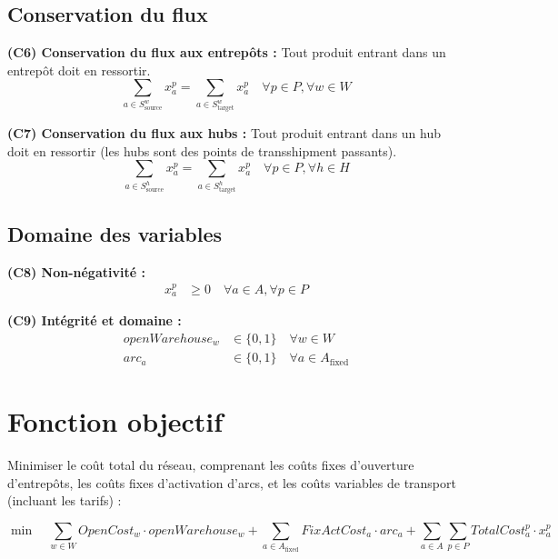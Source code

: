 \documentclass{article}
\begin{document}
\subsection{Conservation du flux}

\noindent\textbf{(C6) Conservation du flux aux entrepôts :}
Tout produit entrant dans un entrepôt doit en ressortir.
\begin{equation}
    \sum_{a \in S_{\text{source}}^w} x_a^p = \sum_{a \in S_{\text{target}}^w} x_a^p \quad \forall p \in P, \forall w \in W \label{eq:wh_flow}
\end{equation}

\noindent\textbf{(C7) Conservation du flux aux hubs :}
Tout produit entrant dans un hub doit en ressortir (les hubs sont des points de transshipment passants).
\begin{equation}
    \sum_{a \in S_{\text{source}}^h} x_a^p = \sum_{a \in S_{\text{target}}^h} x_a^p \quad \forall p \in P, \forall h \in H \label{eq:hub_flow}
\end{equation}

\subsection{Domaine des variables}

\noindent\textbf{(C8) Non-négativité :}
\begin{align}
    x_a^p &\ge 0 \quad \forall a \in A, \forall p \in P \label{eq:flow_nonneg}
\end{align}

\noindent\textbf{(C9) Intégrité et domaine :}
\begin{align}
    openWarehouse_w &\in \{0, 1\} \quad \forall w \in W \label{eq:wh_binary}\\
    arc_a &\in \{0, 1\} \quad \forall a \in A_{\text{fixed}} \label{eq:arc_binary}
\end{align}

\section{Fonction objectif}

Minimiser le coût total du réseau, comprenant les coûts fixes d'ouverture d'entrepôts,
les coûts fixes d'activation d'arcs, et les coûts variables de transport (incluant les tarifs) :

\begin{equation}
    \min \quad
    \sum_{w \in W} OpenCost_w \cdot openWarehouse_w
    + \sum_{a \in A_{\text{fixed}}} FixActCost_a \cdot arc_a
    + \sum_{a \in A} \sum_{p \in P} TotalCost_a^p \cdot x_a^p
    \label{eq:objective}
\end{equation}
\end{document}
